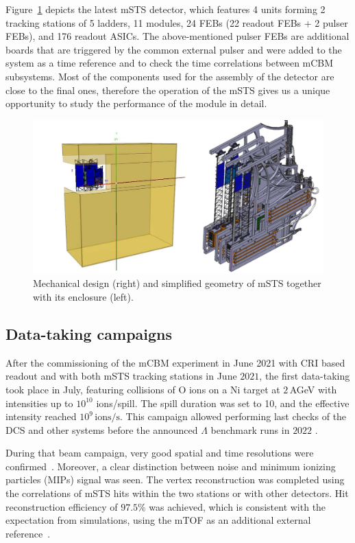 Figure~\ref{fig_mSTS} depicts the latest \gls{mSTS} detector, which features \num{4} units forming \num{2} tracking stations of \num{5} ladders, \num{11} modules, \num{24} \glspl{FEB} (\num{22} readout \glspl{FEB} + \num{2} pulser \glspl{FEB}), and \num{176} readout \glspl{ASIC}. The above-mentioned pulser \glspl{FEB} are additional boards that are triggered by the common external pulser and were added to the system as a time reference and to check the time correlations between \gls{mCBM} subsystems.  Most of the components used for the assembly of the detector are close to the final ones, therefore the operation of the \gls{mSTS} gives us a unique opportunity to study the performance of the module in detail.
\begin{figure}[!h]
\centering
\includegraphics[width=0.75\columnwidth]{Chapter6/DCS/images/mSTS_mech.png}
\caption{Mechanical design (right) and simplified geometry of \gls{mSTS} together with its enclosure (left).}
\label{fig_mSTS}
\end{figure}
\newpage
\subsection{Data-taking campaigns}
After the commissioning of the \gls{mCBM} experiment in June \num{2021} with \gls{CRI} based readout and with both \gls{mSTS} tracking stations in June $2021$, the first data-taking took place in July, featuring collisions of O ions on a Ni target at $2$\,AGeV with intensities up to $10^{10}$ ions/spill. The spill duration was set to \SI{10}{\sec}, and the effective intensity reached $10^{9}\,\mathrm{ions/s}$. This campaign allowed performing last checks of the \gls{DCS} and other systems before the announced $\Lambda$ benchmark runs in $2022$ \cite{sturm3}.

During that beam campaign, very good spatial and time resolutions were confirmed~\cite{dario1}. Moreover, a clear distinction between noise and minimum ionizing particles (\glspl{MIP}) signal was seen.
The vertex reconstruction was completed using the correlations of \gls{mSTS} hits within the two stations or with other detectors. Hit reconstruction efficiency of $97.5$\% was achieved, which is consistent with the expectation from simulations, using the mTOF as an additional external reference~\cite{dario1}.

